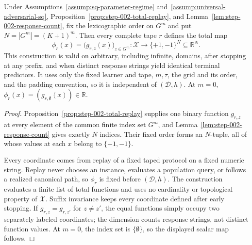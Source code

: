 \begin{proposition}
\label{prop:step-002-feature-map}
Under Assumptions~\ref{assump:sq-parameter-regime}
and~\ref{assump:universal-adversarial-sq},
Proposition~\ref{prop:step-002-total-replay}, and
Lemma~\ref{lem:step-002-response-count}, fix the lexicographic order on
\(G^m\) and put \(N=|G^m|=(K+1)^m\).  Then every complete tape \(r\)
defines the total map
\[
\phi_r(x)=\bigl(g_{r,z}(x)\bigr)_{z\in G^m}:
\mathcal X\to\{+1,-1\}^{N}\subseteq\mathbb R^N.
\]
This construction is valid on arbitrary, including infinite, domains, after
stopping at any prefix, and when distinct response strings yield identical
terminal predictors.  It uses only the fixed learner and tape, \(m,\tau\),
the grid and its order, and the padding convention, so it is independent of
\((\mathcal D,h)\).  At \(m=0\),
\(\phi_r(x)=(g_{r,\emptyset}(x))\in\mathbb R\).
\end{proposition}

\begin{proof}
Proposition~\ref{prop:step-002-total-replay} supplies one binary function
\(g_{r,z}\) at every element of the common finite index set \(G^m\), and
Lemma~\ref{lem:step-002-response-count} gives exactly \(N\) indices.  Their
fixed order forms an \(N\)-tuple, all of whose values at each \(x\) belong
to \(\{+1,-1\}\).

Every coordinate comes from replay of a fixed taped protocol on a fixed
numeric string.  Replay never chooses an instance, evaluates a population
query, or follows a realized canonical path, so \(\phi_r\) is fixed before
\((\mathcal D,h)\).  The construction evaluates a finite list of total
functions and uses no cardinality or topological property of \(\mathcal X\).
Suffix invariance keeps every coordinate defined after early stopping.  If
\(g_{r,z}=g_{r,z'}\) for \(z\ne z'\), the equal functions simply occupy two
separately labeled coordinates; the dimension counts response strings, not
distinct function values.  At \(m=0\), the index set is
\(\{\emptyset\}\), so the displayed scalar map follows.
\end{proof}

